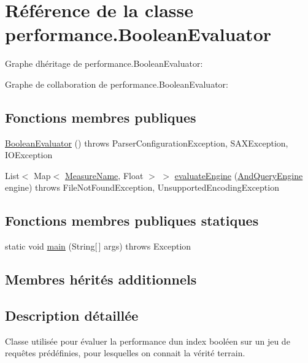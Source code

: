 \hypertarget{classperformance_1_1BooleanEvaluator}{}\section{Référence de la classe performance.\+Boolean\+Evaluator}
\label{classperformance_1_1BooleanEvaluator}


Graphe d\textquotesingle{}héritage de performance.\+Boolean\+Evaluator\+:


Graphe de collaboration de performance.\+Boolean\+Evaluator\+:
\subsection*{Fonctions membres publiques}
\begin{DoxyCompactItemize}
\item 
\hyperlink{classperformance_1_1BooleanEvaluator_a243542a428c224342cf251b2fdea7ea7}{Boolean\+Evaluator} ()  throws Parser\+Configuration\+Exception, S\+A\+X\+Exception, I\+O\+Exception 	
\item 
List$<$ Map$<$ \hyperlink{enumperformance_1_1AbstractEvaluator_1_1MeasureName}{Measure\+Name}, Float $>$ $>$ \hyperlink{classperformance_1_1BooleanEvaluator_ade31854f4fa51d7d607012acb88a8d62}{evaluate\+Engine} (\hyperlink{classquery_1_1AndQueryEngine}{And\+Query\+Engine} engine)  throws File\+Not\+Found\+Exception, Unsupported\+Encoding\+Exception 	
\end{DoxyCompactItemize}
\subsection*{Fonctions membres publiques statiques}
\begin{DoxyCompactItemize}
\item 
static void \hyperlink{classperformance_1_1BooleanEvaluator_a0b9db2f07b9e1e032375ca1f6054544b}{main} (String\mbox{[}$\,$\mbox{]} args)  throws Exception  	
\end{DoxyCompactItemize}
\subsection*{Membres hérités additionnels}


\subsection{Description détaillée}
Classe utilisée pour évaluer la performance d\textquotesingle{}un index booléen sur un jeu de requêtes prédéfinies, pour lesquelles on connait la vérité terrain. 

